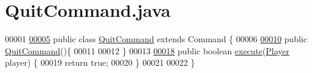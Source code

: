 \hypertarget{QuitCommand_8java_source}{\section{Quit\-Command.\-java}
}

\begin{DoxyCode}
00001 
\hypertarget{QuitCommand_8java_source_l00005}{}\hyperlink{classQuitCommand}{00005} \textcolor{keyword}{public} \textcolor{keyword}{class }\hyperlink{classQuitCommand}{QuitCommand} \textcolor{keyword}{extends} Command \{
00006 
\hypertarget{QuitCommand_8java_source_l00010}{}\hyperlink{classQuitCommand_a3081011e681aabc33b470734f3a2d8f2}{00010}     \textcolor{keyword}{public} \hyperlink{classQuitCommand_a3081011e681aabc33b470734f3a2d8f2}{QuitCommand}()\{
00011 
00012     \}
00013 
\hypertarget{QuitCommand_8java_source_l00018}{}\hyperlink{classQuitCommand_aae6dc40d21d087738489b8ab5edcbc90}{00018}     \textcolor{keyword}{public} \textcolor{keywordtype}{boolean} \hyperlink{classQuitCommand_aae6dc40d21d087738489b8ab5edcbc90}{execute}(\hyperlink{classPlayer}{Player} player) \{
00019         \textcolor{keywordflow}{return} \textcolor{keyword}{true};
00020     \}
00021 
00022 \}
\end{DoxyCode}
